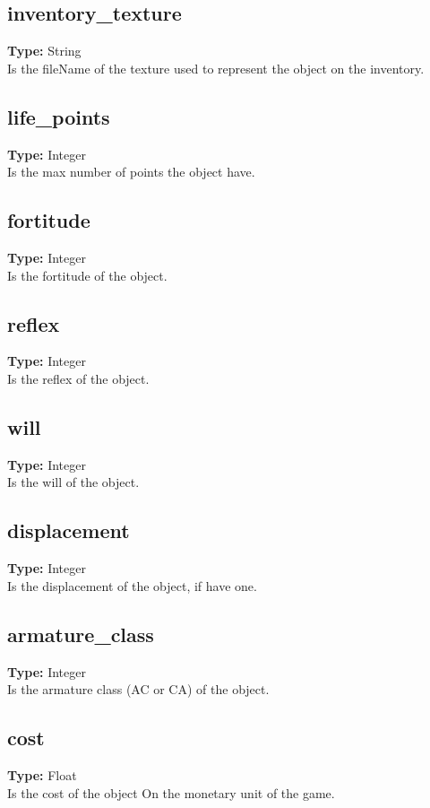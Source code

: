 \documentclass[letterpaper,12pt]{article}
\begin{document}
\subsection{inventory\_texture}
{\bf Type:} String\\
Is the fileName of the texture used to represent the object on the inventory.

\subsection{life\_points}
{\bf Type:} Integer\\
Is the max number of points the object have.

\subsection{fortitude}
{\bf Type:} Integer\\
Is the fortitude of the object.

\subsection{reflex}
{\bf Type:} Integer\\
Is the reflex of the object.

\subsection{will}
{\bf Type:} Integer\\
Is the will of the object.

\subsection{displacement}
{\bf Type:} Integer\\
Is the displacement of the object, if have one.

\subsection{armature\_class}
{\bf Type:} Integer\\
Is the armature class (AC or CA) of the object.

\subsection{cost}
{\bf Type:} Float\\
Is the cost of the object On the monetary unit of the game.
\end{document}
